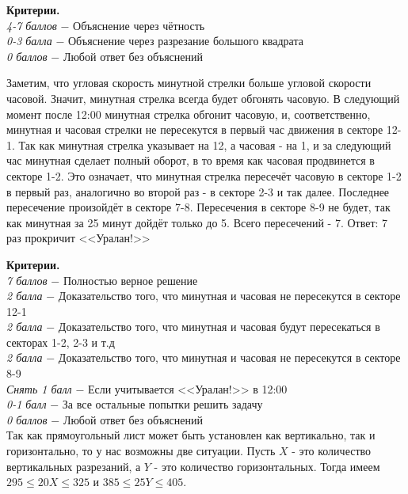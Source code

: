 \textbf{Критерии.} \\
\textit{4-7 баллов} $-$ Объяснение через чётность\\
\textit{0-3 балла} $-$ Объяснение через разрезание большого квадрата\\
\textit{0 баллов} $-$ Любой ответ без объяснений\\

\centerline{\bf }



 Заметим, что угловая скорость минутной стрелки больше угловой скорости часовой. Значит, минутная стрелка всегда будет обгонять часовую. В следующий момент после 12:00 минутная стрелка обгонит часовую, и, соответственно, минутная и часовая стрелки не пересекутся в первый час движения в секторе 12-1. Так как минутная стрелка указывает на 12, а часовая - на 1, и за следующий час минутная сделает полный оборот, в то время как часовая продвинется в секторе 1-2. Это означает, что минутная стрелка пересечёт часовую в секторе 1-2 в первый раз, аналогично во второй раз - в секторе 2-3 и так далее. Последнее пересечение произойдёт в секторе 7-8. Пересечения в секторе 8-9 не будет, так как минутная за 25 минут дойдёт только до 5. Всего пересечений - 7. Ответ: 7 раз прокричит <<Уралан!>>\par

\textbf{Критерии.} \\
\textit{7 баллов} $-$ Полностью верное решение\\
\textit{2 балла} $-$ Доказательство того, что минутная и часовая не пересекутся в секторе 12-1\\
\textit{2 балла} $-$ Доказательство того, что минутная и часовая будут пересекаться в секторах 1-2, 2-3 и т.д\\
\textit{2 балла} $-$ Доказательство того, что минутная и часовая не пересекутся в секторе 8-9\\
\textit{Снять 1 балл} $-$ Если учитывается <<Уралан!>> в 12:00\\ 
\textit{0-1 балл} $-$ За все остальные попытки решить задачу\\
\textit{0 баллов} $-$ Любой ответ без объяснений\\

 Так как прямоугольный лист может быть установлен как вертикально, так и горизонтально, то у нас возможны две ситуации. Пусть $X$ - это количество вертикальных разрезаний, а $Y$ - это количество горизонтальных. Тогда имеем $295	\leqslant 20X 	\leqslant 325$ и $385	\leqslant 25Y 	\leqslant 405$. 

